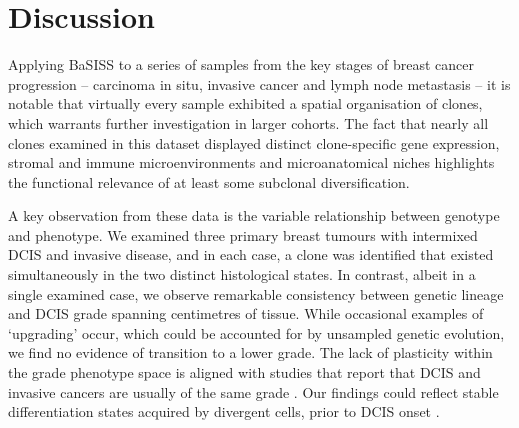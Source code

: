 \section{Discussion}
\label{sec:application-discussion}

Applying \ac{BaSISS} to a series of samples from the key stages of breast cancer progression -- carcinoma in situ, invasive cancer and lymph node metastasis -- it is notable that virtually every sample exhibited a spatial organisation of clones, which warrants further investigation in larger cohorts. The fact that nearly all clones examined in this dataset displayed distinct clone-specific gene expression, stromal and immune microenvironments and microanatomical niches highlights the functional relevance of at least some subclonal diversification.

A key observation from these data is the variable relationship between genotype and phenotype. We examined three primary breast tumours with intermixed \ac{DCIS} and invasive disease, and in each case, a clone was identified that existed simultaneously in the two distinct histological states. In contrast, albeit in a single examined case, we observe remarkable consistency between genetic lineage and \ac{DCIS} grade spanning centimetres of tissue. While occasional examples of `upgrading' occur, which could be accounted for by unsampled genetic evolution, we find no evidence of transition to a lower grade. The lack of plasticity within the grade phenotype space is aligned with studies that report that \ac{DCIS} and invasive cancers are usually of the same grade \parencite{Gupta1997-om,Van_Luijt2016-vq}. Our findings could reflect stable differentiation states acquired by divergent cells, prior to \ac{DCIS} onset \parencite{Rakha2022-qm}.

